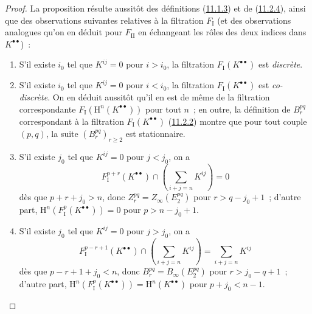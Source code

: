 \begin{proof}
La proposition résulte aussitôt des définitions
(\hyperref[0.11.1.3-fr]{11.1.3}) et de
(\hyperref[0.11.2.4-fr]{11.2.4}), ainsi que des observations suivantes
relatives à la filtration $F_{\mathrm I}$ (et des observations analogues qu'on
en déduit pour $F_{\mathrm{II}}$ en échangeant les rôles des deux indices
dans $K^{\bullet\bullet}$)~:
\begin{enumerate}
  \item[$1^\circ$] S'il existe $i_0$ tel que $K^{ij}=0$ pour $i>i_0$, la
    filtration $F_{\mathrm I}(K^{\bullet\bullet})$ est \emph{discrète}.
  \item[$2^\circ$] S'il existe $i_0$ tel que $K^{ij}=0$ pour $i<i_0$, la
    filtration $F_{\mathrm I}(K^{\bullet\bullet})$ est \emph{co-discrète}. On en
    déduit aussitôt qu'il en est de même de la filtration correspondante
    $F_{\mathrm I}(\mathrm H^n(K^{\bullet\bullet}))$ pour tout $n$~; en
    outre, la définition de $B_r^{pq}$ correspondant à la filtration
    $F_{\mathrm I}(K^{\bullet\bullet})$
    (\hyperref[0.11.2.2-fr]{11.2.2}) montre que pour tout couple $(p,q)$, la
    suite $(B_r^{pq})_{r\geq2}$ est stationnaire.
  \item[$3^\circ$] S'il existe $j_0$ tel que $K^{ij}=0$ pour $j<j_0$, on a
    \[
      F_{\mathrm I}^{p+r}(K^{\bullet\bullet})
      \cap\left(\sum_{i+j=n}K^{ij}\right)=0
    \]
    dès que $p+r+j_0>n$, donc
    $Z_r^{pq}=Z_\infty(E_2^{pq})$ pour $r>q-j_0+1$~; d'autre part,
    $\mathrm H^n(F_{\mathrm I}^p(K^{\bullet\bullet}))=0$ pour
    $p>n-j_0+1$.
  \item[$4^\circ$] S'il existe $j_0$ tel que $K^{ij}=0$ pour $j>j_0$, on a
    \[
      F_{\mathrm I}^{p-r+1}(K^{\bullet\bullet})
      \cap\left(\sum_{i+j=n}K^{ij}\right)=\sum_{i+j=n}K^{ij}
    \]
    dès que $p-r+1+j_0<n$, donc
    $B_r^{pq}=B_\infty(E_2^{pq})$ pour $r>j_0-q+1$~; d'autre part,
    $\mathrm H^n(F_{\mathrm I}^p(K^{\bullet\bullet}))
    =\mathrm H^n(K^{\bullet\bullet})$ pour $p+j_0<n-1$.
\end{enumerate}
\end{proof}

